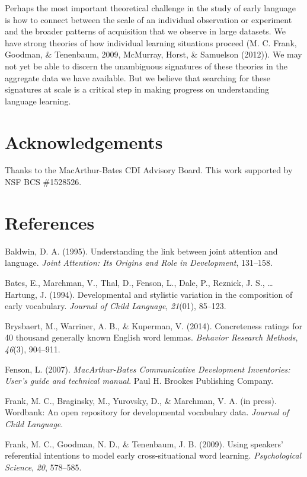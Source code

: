 \documentclass[10pt, letterpaper]{article}
\begin{document}
Perhaps the most important theoretical challenge in the study of early
language is how to connect between the scale of an individual
observation or experiment and the broader patterns of acquisition that
we observe in large datasets. We have strong theories of how individual
learning situations proceed (M. C. Frank, Goodman, \& Tenenbaum, 2009,
McMurray, Horst, \& Samuelson (2012)). We may not yet be able to discern
the unambiguous signatures of these theories in the aggregate data we
have available. But we believe that searching for these signatures at
scale is a critical step in making progress on understanding language
learning.

\section{Acknowledgements}\label{acknowledgements}

Thanks to the MacArthur-Bates CDI Advisory Board. This work supported by
NSF BCS \#1528526.

\section{References}\label{references}

\setlength{\parindent}{-0.1in} \setlength{\leftskip}{0.125in} \noindent

Baldwin, D. A. (1995). Understanding the link between joint attention
and language. \emph{Joint Attention: Its Origins and Role in
Development}, 131--158.

Bates, E., Marchman, V., Thal, D., Fenson, L., Dale, P., Reznick, J. S.,
\ldots{} Hartung, J. (1994). Developmental and stylistic variation in
the composition of early vocabulary. \emph{Journal of Child Language},
\emph{21}(01), 85--123.

Brysbaert, M., Warriner, A. B., \& Kuperman, V. (2014). Concreteness
ratings for 40 thousand generally known English word lemmas.
\emph{Behavior Research Methods}, \emph{46}(3), 904--911.

Fenson, L. (2007). \emph{MacArthur-Bates Communicative Development
Inventories: User's guide and technical manual}. Paul H. Brookes
Publishing Company.

Frank, M. C., Braginsky, M., Yurovsky, D., \& Marchman, V. A. (in
press). Wordbank: An open repository for developmental vocabulary data.
\emph{Journal of Child Language}.

Frank, M. C., Goodman, N. D., \& Tenenbaum, J. B. (2009). Using
speakers' referential intentions to model early cross-situational word
learning. \emph{Psychological Science}, \emph{20}, 578--585.
\end{document}
